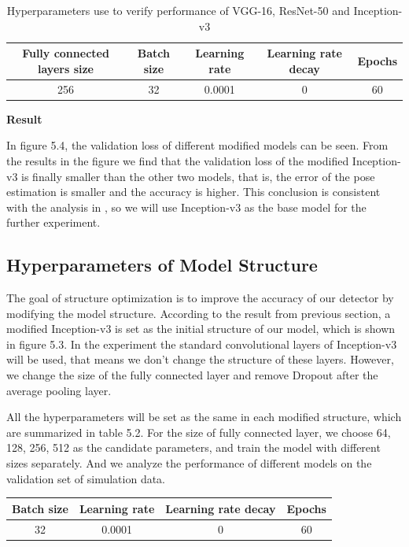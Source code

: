 \begin{table}[]
	\begin{tabular}{c|c|c|c|c}
		\hline
		\textbf{Fully connected layers size} & \textbf{Batch size} & \textbf{Learning rate} & \textbf{Learning rate decay} & \textbf{Epochs} \\ \hline
		256                                  & 32                  & 0.0001                 & 0                            & 60              \\ \hline
	\end{tabular}
	\caption{Hyperparameters use to verify performance of VGG-16, ResNet-50 and Inception-v3 }
	\label{table:Compare_basemodel}
\end{table}

\textbf{Result}
\missingfigure{}

In figure 5.4, the validation loss of different modified models can be seen. From the results in the figure we find that the validation loss of the modified Inception-v3 is finally smaller than the other two models, that is, the error of the pose estimation is smaller and the accuracy is higher.  This conclusion is consistent with the analysis in \cite{canziani2016analysis}, so we will use Inception-v3 as the base model for the further experiment.

\subsection{Hyperparameters of Model Structure}
The goal of structure optimization is to improve the accuracy of our detector by modifying the model structure. According to the result from previous section, a modified Inception-v3 is set as the initial structure of our model, which is shown in figure 5.3. In the experiment the standard convolutional layers of Inception-v3 will be used, that means we don't change the structure of these layers. However, we change the size of the fully connected layer and 
remove Dropout after the average pooling layer.

All the hyperparameters will be set as the same in each modified structure, which are summarized in table 5.2. For the size of fully connected layer, we choose 64, 128, 256, 512 as the candidate parameters, and train the model with different sizes separately. And we analyze the performance of different models on the validation set of simulation data.

\begin{table}[]
	\begin{tabular}{c|c|c|c}
		\hline
		\textbf{Batch size} & \textbf{Learning rate} & \textbf{Learning rate decay} & \textbf{Epochs} \\ \hline
		32                  & 0.0001                 & 0                            & 60              \\ \hline
	\end{tabular}
\end{table}

